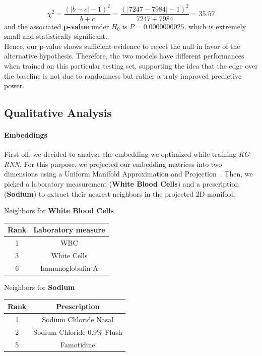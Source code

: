 \begin{equation}
\chi^2 = \frac{(|b-c|-1)^2}{b+c} = \frac{(|7247-7984|-1)^2}{7247+7984} = 35.57
\end{equation}
and the associated \textbf{p-value} under $H_0$ is $P=0.0000000025$, which is extremely small and statistically significant. \\

Hence, our p-value shows sufficient evidence to reject the null in favor of the alternative hypothesis. Therefore, the two models have different performances when trained on this particular testing set, supporting the idea that the edge over the baseline is not due to randomness but rather a truly improved predictive power.

\newpage
\subsection{Qualitative Analysis}
\label{subsec:Qualitative analysis}
\paragraph{Embeddings} First off, we decided to analyze the embedding we optimized while training \emph{KG-RNN}. For this purpose, we projected our embedding matrices into two dimensions using a Uniform Manifold Approximation and Projection~\cite{2018arXivUMAP}. Then, we picked a laboratory measurement (\textbf{White Blood Cells}) and a prescription (\textbf{Sodium}) to extract their nearest neighbors in the projected 2D manifold:
\begin{multicols}{2}
 \centering
 Neighbors for \textbf{White Blood Cells}
 \begin{center}
  \begin{tabular}{| c | c |}
   \hline
   \textbf{Rank} & \textbf{Laboratory measure} \\ \hline
   1 & WBC \\ \hline
   3 & White Cells \\ \hline
   6 & Immunoglobulin A \\
   \hline
  \end{tabular}
 \end{center}\columnbreak
 \vfill
 Neighbors for \textbf{Sodium}
 \begin{center}
  \begin{tabular}{| c | c |}
   \hline
   \textbf{Rank} & \textbf{Prescription} \\ \hline
   1 & Sodium Chloride Nasal \\ \hline
   2 & Sodium Chloride 0.9\%  Flush \\ \hline
   5 & Famotidine \\
   \hline
  \end{tabular}
 \end{center}
\end{multicols}

